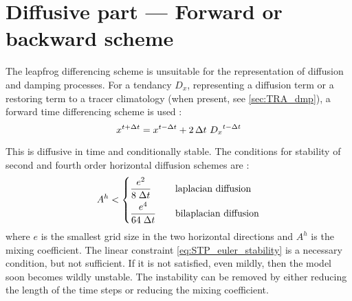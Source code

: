 \documentclass[../main/NEMO_manual]{subfiles}
\begin{document}
\section{Diffusive part --- Forward or backward scheme}
\label{sec:STP_forward_imp}

The leapfrog differencing scheme is unsuitable for the representation of diffusion and damping processes.
For a tendancy $D_x$, representing a diffusion term or a restoring term to a tracer climatology
(when present, see \autoref{sec:TRA_dmp}), a forward time differencing scheme is used :
\[
   x^{t+\Delta t} = x^{t-\Delta t} + 2 \, \Delta t \ {D_x}^{t-\Delta t}
\] 

This is diffusive in time and conditionally stable.
The conditions for stability of second and fourth order horizontal diffusion schemes are \citep{Griffies_Bk04}:
\begin{equation}
  \label{eq:STP_euler_stability}
  A^h < \left\{
    \begin{aligned}
      &\frac{e^2}{  8 \; \Delta t } 	&&\quad \text{laplacian diffusion} 	\\
      &\frac{e^4}{64 \; \Delta t } 	&&\quad \text{bilaplacian diffusion}
    \end{aligned}
  \right.
\end{equation}
where $e$ is the smallest grid size in the two horizontal directions and $A^h$ is the mixing coefficient.
The linear constraint \autoref{eq:STP_euler_stability} is a necessary condition, but not sufficient.
If it is not satisfied, even mildly, then the model soon becomes wildly unstable.
The instability can be removed by either reducing the length of the time steps or reducing the mixing coefficient.
\end{document}
